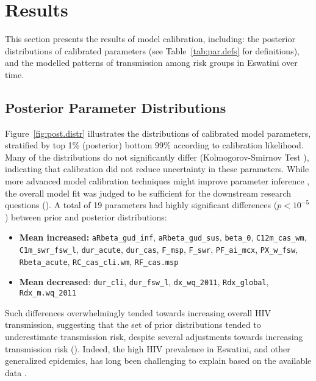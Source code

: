 \section{Results}\label{model.res}
This section presents the results of model calibration, including:
the posterior distributions of calibrated parameters (see Table~\ref{tab:par.defs} for definitions),
and the modelled patterns of transmission among risk groups in Eswatini over time.
\subsection{Posterior Parameter Distributions}\label{model.res.par}
Figure~\ref{fig:post.distr} illustrates the distributions of calibrated model parameters,
stratified by top 1\% (posterior) \vs bottom 99\% according to calibration likelihood.
Many of the distributions do not significantly differ
(Kolmogorov-Smirnov Test \cite{Murtagh2014}),
indicating that calibration did not reduce uncertainty in these parameters.
While more advanced model calibration techniques
might improve parameter inference \cite{Menzies2017},
the overall model fit was judged to be sufficient
for the downstream research questions ().
A total of 19 parameters had highly significant differences ($p < 10^{-5}$)
between prior and posterior distributions:
\begin{itemize}
  \item \textbf{Mean increased:}
    \texttt{aRbeta_gud_inf},
    \texttt{aRbeta_gud_sus},
    \texttt{beta_0},
    \texttt{C12m_cas_wm},
    \texttt{C1m_swr_fsw_l},
    \texttt{dur_acute},
    \texttt{dur_cas},
    \texttt{F_msp},
    \texttt{F_swr},
    \texttt{PF_ai_mcx},
    \texttt{PX_w_fsw},
    \texttt{Rbeta_acute},
    \texttt{RC_cas_cli.wm},
    \texttt{RF_cas.msp}
  \item \textbf{Mean decreased}:
    \texttt{dur_cli},
    \texttt{dur_fsw_l},
    \texttt{dx_wq_2011},
    \texttt{Rdx_global},
    \texttt{Rdx_m.wq_2011}
\end{itemize}
Such differences overwhelmingly tended towards increasing overall HIV transmission,
suggesting that the set of prior distributions tended to underestimate transmission risk,
despite several adjustments towards increasing transmission risk ().
Indeed, the high HIV prevalence in Eswatini, and other generalized epidemics,
has long been challenging to explain based on the available data \cite{Whiteside2003,Shelton2010}.
